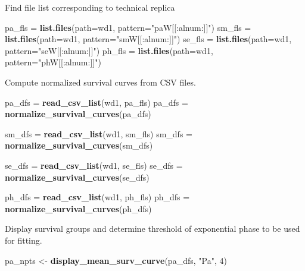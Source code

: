 \documentclass[]{article}
\newenvironment{Shaded}{\begin{snugshade}}{\end{snugshade}}
\newcommand{\KeywordTok}[1]{\textcolor[rgb]{0.13,0.29,0.53}{\textbf{#1}}}
\newcommand{\DataTypeTok}[1]{\textcolor[rgb]{0.13,0.29,0.53}{#1}}
\newcommand{\DecValTok}[1]{\textcolor[rgb]{0.00,0.00,0.81}{#1}}
\newcommand{\StringTok}[1]{\textcolor[rgb]{0.31,0.60,0.02}{#1}}
\newcommand{\NormalTok}[1]{#1}
\begin{document}
Find file list corresponding to technical replica

\begin{Shaded}
\begin{Highlighting}[]
\NormalTok{pa_fls =}\StringTok{ }\KeywordTok{list.files}\NormalTok{(}\DataTypeTok{path=}\NormalTok{wd1, }\DataTypeTok{pattern=}\StringTok{"paW[[:alnum:]]"}\NormalTok{)}
\NormalTok{sm_fls =}\StringTok{ }\KeywordTok{list.files}\NormalTok{(}\DataTypeTok{path=}\NormalTok{wd1, }\DataTypeTok{pattern=}\StringTok{"smW[[:alnum:]]"}\NormalTok{)}
\NormalTok{se_fls =}\StringTok{ }\KeywordTok{list.files}\NormalTok{(}\DataTypeTok{path=}\NormalTok{wd1, }\DataTypeTok{pattern=}\StringTok{"seW[[:alnum:]]"}\NormalTok{)}
\NormalTok{ph_fls =}\StringTok{ }\KeywordTok{list.files}\NormalTok{(}\DataTypeTok{path=}\NormalTok{wd1, }\DataTypeTok{pattern=}\StringTok{"phW[[:alnum:]]"}\NormalTok{)}
\end{Highlighting}
\end{Shaded}

Compute normalized survival curves from CSV files.

\begin{Shaded}
\begin{Highlighting}[]
\NormalTok{pa_dfs =}\StringTok{ }\KeywordTok{read_csv_list}\NormalTok{(wd1, pa_fls)}
\NormalTok{pa_dfs =}\StringTok{ }\KeywordTok{normalize_survival_curves}\NormalTok{(pa_dfs)}

\NormalTok{sm_dfs =}\StringTok{ }\KeywordTok{read_csv_list}\NormalTok{(wd1, sm_fls)}
\NormalTok{sm_dfs =}\StringTok{ }\KeywordTok{normalize_survival_curves}\NormalTok{(sm_dfs)}

\NormalTok{se_dfs =}\StringTok{ }\KeywordTok{read_csv_list}\NormalTok{(wd1, se_fls)}
\NormalTok{se_dfs =}\StringTok{ }\KeywordTok{normalize_survival_curves}\NormalTok{(se_dfs)}

\NormalTok{ph_dfs =}\StringTok{ }\KeywordTok{read_csv_list}\NormalTok{(wd1, ph_fls)}
\NormalTok{ph_dfs =}\StringTok{ }\KeywordTok{normalize_survival_curves}\NormalTok{(ph_dfs)}
\end{Highlighting}
\end{Shaded}

Display survival groups and determine threshold of exponential phase to
be used for fitting.

\begin{Shaded}
\begin{Highlighting}[]
\NormalTok{pa_npts <-}\StringTok{  }\KeywordTok{display_mean_surv_curve}\NormalTok{(pa_dfs, }\StringTok{"Pa"}\NormalTok{, }\DecValTok{4}\NormalTok{)}
\end{Highlighting}
\end{Shaded}
\end{document}

